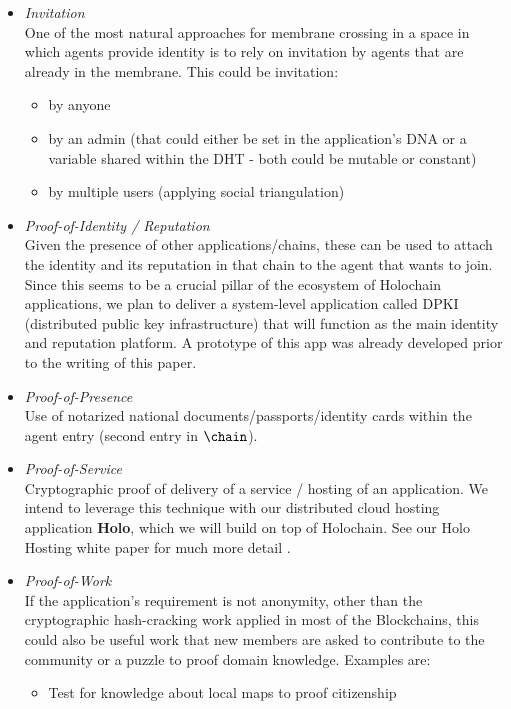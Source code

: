 \documentclass[twocolumn,showpacs,%
  nofootinbib,aps,superscriptaddress,%
  eqsecnum,prd,notitlepage,showkeys,10pt]{revtex4-1}
\begin{document}
\begin{itemize}
  \item \textit{Invitation}\\
  One of the most natural approaches for membrane crossing in a space in which
  agents provide identity is to rely on invitation by agents that are already
  in the membrane. This could be invitation:
  \begin{itemize}
    \item by anyone
    \item by an admin (that could either be set in the application's DNA or a
    variable shared within the DHT - both could be mutable or constant)
    \item by multiple users (applying social triangulation)
  \end{itemize}
  \item \textit{Proof-of-Identity / Reputation}\\
  Given the presence of other applications/chains, these can be used to attach the
  identity and its reputation in that chain to the agent that wants to join.
  Since this seems to be a crucial pillar of the ecosystem of Holochain
  applications, we plan to deliver a system-level application called DPKI
  (distributed public key infrastructure) that will function as the main
  identity and reputation platform.
  A prototype of this app was already developed prior to the writing of
  this paper.
  \item \textit{Proof-of-Presence}\\
  Use of notarized national documents/passports/identity cards within the agent
  entry (second entry in $\chain$).
  \item \textit{Proof-of-Service}\\
  Cryptographic proof of delivery of a service / hosting of an application.
  We intend to leverage this technique with our distributed cloud hosting
  application \textbf{Holo}, which we will build on top of Holochain.
  See our Holo Hosting white paper for much more detail \cite{hosting-wp}.
  \item \textit{Proof-of-Work}\\
  If the application's requirement is not anonymity, other than the
  cryptographic hash-cracking work applied in most of the Blockchains,
  this could also be useful work that new members are asked to contribute
  to the community
  or a puzzle to proof domain knowledge. Examples are:
  \begin{itemize}
    \item Test for knowledge about local maps to proof citizenship

\end{itemize}
\end{itemize}
\end{document}
